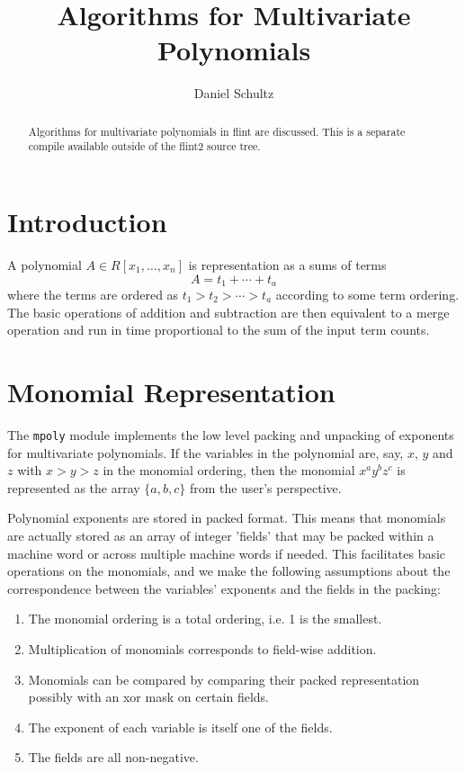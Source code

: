 \documentclass[11pt,reqno]{amsart}
\title{Algorithms for Multivariate Polynomials}
\author{Daniel Schultz}
\numberwithin{equation}{section}
\begin{document}
\begin{abstract}
Algorithms for multivariate polynomials in flint are discussed. This is a separate compile available outside of the flint2 source tree.
\end{abstract}


\maketitle

\section{Introduction}

A polynomial $A \in R[x_1,\dots,x_n]$ is representation as a sums of terms
\begin{equation*}
A = t_1 + \cdots + t_a
\end{equation*}
where the terms are ordered as $t_1 > t_2 > \cdots > t_a$ according to some term ordering. The basic operations of addition and subtraction are then equivalent to a merge operation and run in time proportional to the sum of the input term counts.


\section{Monomial Representation}

The {\tt mpoly} module implements the low level packing and unpacking of exponents
for multivariate polynomials. If the variables in the polynomial are, say,
$x$, $y$ and $z$ with $x > y > z$ in the monomial ordering, then the monomial
$x^a y^b z^c$ is represented as the array $\{a, b, c\}$ from the user's perspective.

Polynomial exponents are stored in packed format. This means that monomials are
actually stored as an array of integer 'fields' that may be packed within
a machine word or across multiple machine words if needed.
This facilitates basic operations on the monomials, and we make the following assumptions about
the correspondence between the variables' exponents and the
fields in the packing:

\begin{enumerate}
\item {The monomial ordering is a total ordering, i.e. 1 is the smallest.}
\item{Multiplication of monomials corresponds to field-wise addition.}
\item{Monomials can be compared by comparing their packed representation possibly with an xor mask on certain fields.}
\item{The exponent of each variable is itself one of the fields.}
\item{The fields are all non-negative.}
\end{enumerate}
\end{document}

